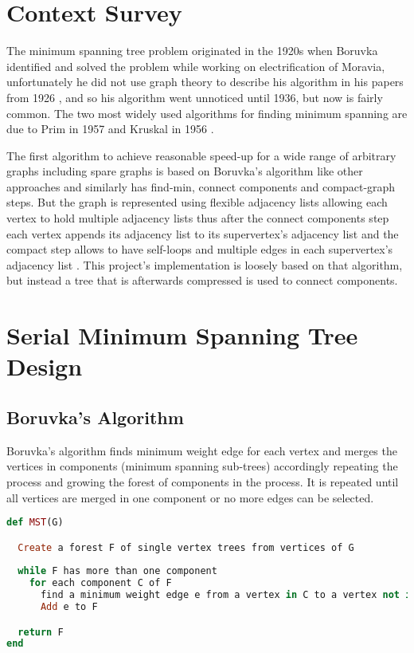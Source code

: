 \documentclass{report}
\theoremstyle{plain}
\theoremstyle{definition}
\theoremstyle{remark}
\begin{document}
\section{Context Survey}

The minimum spanning tree problem originated in the 1920s when Boruvka identified and solved the problem while working on electrification of Moravia, unfortunately he did not use graph theory to describe his algorithm in his papers from 1926 \cite{nevsetvril2001otakar}, and so his algorithm went unnoticed until 1936, but now is fairly common. The two most widely used algorithms for finding minimum spanning are due to Prim in 1957 \cite{Prim1957shortest} and Kruskal in 1956 \cite{kruskal1956shortest}.

The first algorithm to achieve reasonable speed-up for a wide range of arbitrary graphs including spare graphs is based on Boruvka's algorithm like other approaches and similarly has find-min, connect components and compact-graph steps. But the graph is represented using flexible adjacency lists allowing each vertex to hold multiple adjacency lists thus after the connect components step each vertex appends its adjacency list to its supervertex's adjacency list and the compact step allows to have self-loops and multiple edges in each supervertex's adjacency list \cite{Bader20061366}. This project's implementation is loosely based on that algorithm, but instead a tree that is afterwards compressed is used to connect components.

\section{Serial Minimum Spanning Tree Design}

\subsection*{Boruvka's Algorithm}

Boruvka's algorithm finds minimum weight edge for each vertex and merges the vertices in components (minimum spanning sub-trees) accordingly repeating the process and growing the forest of components in the process. It is repeated until all vertices are merged in one component or no more edges can be selected.

\begin{lstlisting}[language=Ruby, mathescape]
def MST(G)

  Create a forest F of single vertex trees from vertices of G
  
  while F has more than one component
    for each component C of F
      find a minimum weight edge e from a vertex in C to a vertex not in C
      Add e to F

  return F
end
\end{lstlisting}
\end{document}
